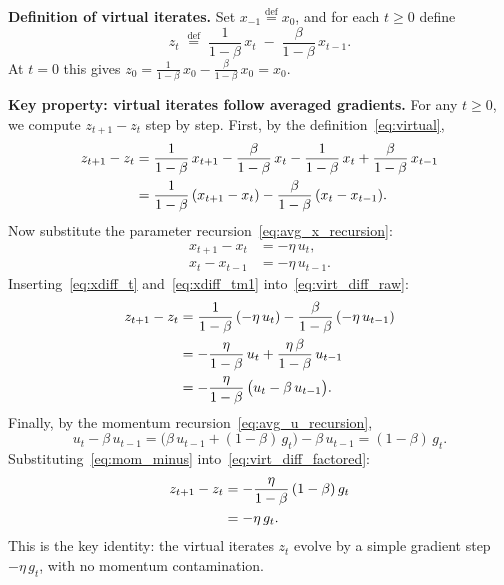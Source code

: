 \documentclass{article}
\begin{document}
\medskip
\noindent\textbf{Definition of virtual iterates.}
Set $x_{-1} \stackrel{\text{def}}{=} x_0$, and for each $t \geq 0$ define
\begin{equation}
z_t \;\stackrel{\text{def}}{=}\;
\frac{1}{1-\beta}\,x_t \;-\; \frac{\beta}{1-\beta}\,x_{t-1}.
\label{eq:virtual}
\end{equation}
At $t = 0$ this gives $z_0 = \frac{1}{1-\beta}\,x_0 - \frac{\beta}{1-\beta}\,x_0 = x_0$.

\medskip
\noindent\textbf{Key property: virtual iterates follow averaged gradients.}
For any $t \geq 0$, we compute $z_{t+1} - z_t$ step by step.
First, by the definition~\eqref{eq:virtual},
\begin{align}
z_{t+1} - z_t
&= \frac{1}{1-\beta}\,x_{t+1} - \frac{\beta}{1-\beta}\,x_t
   - \frac{1}{1-\beta}\,x_t + \frac{\beta}{1-\beta}\,x_{t-1} \notag \\
&= \frac{1}{1-\beta}\,(x_{t+1} - x_t)
   - \frac{\beta}{1-\beta}\,(x_t - x_{t-1}).
\label{eq:virt_diff_raw}
\end{align}
Now substitute the parameter recursion~\eqref{eq:avg_x_recursion}:
\begin{align}
x_{t+1} - x_t &= -\eta\,u_t, \label{eq:xdiff_t} \\
x_t - x_{t-1}  &= -\eta\,u_{t-1}. \label{eq:xdiff_tm1}
\end{align}
Inserting~\eqref{eq:xdiff_t} and~\eqref{eq:xdiff_tm1}
into~\eqref{eq:virt_diff_raw}:
\begin{align}
z_{t+1} - z_t
&= \frac{1}{1-\beta}\,(-\eta\,u_t)
   - \frac{\beta}{1-\beta}\,(-\eta\,u_{t-1}) \notag \\
&= -\frac{\eta}{1-\beta}\,u_t
   + \frac{\eta\,\beta}{1-\beta}\,u_{t-1} \notag \\
&= -\frac{\eta}{1-\beta}\,
   \bigl(u_t - \beta\,u_{t-1}\bigr).
\label{eq:virt_diff_factored}
\end{align}
Finally, by the momentum recursion~\eqref{eq:avg_u_recursion},
\begin{equation}
u_t - \beta\,u_{t-1}
= \bigl(\beta\,u_{t-1} + (1-\beta)\,g_t\bigr) - \beta\,u_{t-1}
= (1-\beta)\,g_t.
\label{eq:mom_minus}
\end{equation}
Substituting~\eqref{eq:mom_minus} into~\eqref{eq:virt_diff_factored}:
\begin{align}
z_{t+1} - z_t
&= -\frac{\eta}{1-\beta}\,(1-\beta)\,g_t \notag \\
&= -\eta\,g_t.
\label{eq:virt_gradient}
\end{align}
This is the key identity: the virtual iterates $z_t$ evolve by a simple
gradient step $-\eta\,g_t$, with no momentum contamination.
\end{document}
